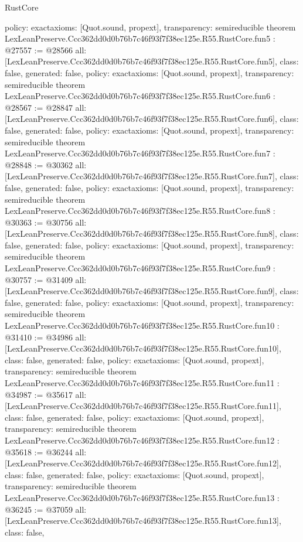 \begin{lexlean}{RustCore}
\begin{coremodule}
{  policy: exact{axioms: [Quot.sound, propext]},
  transparency: semireducible
}
theorem LexLeanPreserve.Ccc362dd0d0b76b7c46f93f7f38ec125e.R55.RustCore.fun5 : @27557 := @28566 {
  all: [LexLeanPreserve.Ccc362dd0d0b76b7c46f93f7f38ec125e.R55.RustCore.fun5],
  class: false,
  generated: false,
  policy: exact{axioms: [Quot.sound, propext]},
  transparency: semireducible
}
theorem LexLeanPreserve.Ccc362dd0d0b76b7c46f93f7f38ec125e.R55.RustCore.fun6 : @28567 := @28847 {
  all: [LexLeanPreserve.Ccc362dd0d0b76b7c46f93f7f38ec125e.R55.RustCore.fun6],
  class: false,
  generated: false,
  policy: exact{axioms: [Quot.sound, propext]},
  transparency: semireducible
}
theorem LexLeanPreserve.Ccc362dd0d0b76b7c46f93f7f38ec125e.R55.RustCore.fun7 : @28848 := @30362 {
  all: [LexLeanPreserve.Ccc362dd0d0b76b7c46f93f7f38ec125e.R55.RustCore.fun7],
  class: false,
  generated: false,
  policy: exact{axioms: [Quot.sound, propext]},
  transparency: semireducible
}
theorem LexLeanPreserve.Ccc362dd0d0b76b7c46f93f7f38ec125e.R55.RustCore.fun8 : @30363 := @30756 {
  all: [LexLeanPreserve.Ccc362dd0d0b76b7c46f93f7f38ec125e.R55.RustCore.fun8],
  class: false,
  generated: false,
  policy: exact{axioms: [Quot.sound, propext]},
  transparency: semireducible
}
theorem LexLeanPreserve.Ccc362dd0d0b76b7c46f93f7f38ec125e.R55.RustCore.fun9 : @30757 := @31409 {
  all: [LexLeanPreserve.Ccc362dd0d0b76b7c46f93f7f38ec125e.R55.RustCore.fun9],
  class: false,
  generated: false,
  policy: exact{axioms: [Quot.sound, propext]},
  transparency: semireducible
}
theorem LexLeanPreserve.Ccc362dd0d0b76b7c46f93f7f38ec125e.R55.RustCore.fun10 : @31410 := @34986 {
  all: [LexLeanPreserve.Ccc362dd0d0b76b7c46f93f7f38ec125e.R55.RustCore.fun10],
  class: false,
  generated: false,
  policy: exact{axioms: [Quot.sound, propext]},
  transparency: semireducible
}
theorem LexLeanPreserve.Ccc362dd0d0b76b7c46f93f7f38ec125e.R55.RustCore.fun11 : @34987 := @35617 {
  all: [LexLeanPreserve.Ccc362dd0d0b76b7c46f93f7f38ec125e.R55.RustCore.fun11],
  class: false,
  generated: false,
  policy: exact{axioms: [Quot.sound, propext]},
  transparency: semireducible
}
theorem LexLeanPreserve.Ccc362dd0d0b76b7c46f93f7f38ec125e.R55.RustCore.fun12 : @35618 := @36244 {
  all: [LexLeanPreserve.Ccc362dd0d0b76b7c46f93f7f38ec125e.R55.RustCore.fun12],
  class: false,
  generated: false,
  policy: exact{axioms: [Quot.sound, propext]},
  transparency: semireducible
}
theorem LexLeanPreserve.Ccc362dd0d0b76b7c46f93f7f38ec125e.R55.RustCore.fun13 : @36245 := @37059 {
  all: [LexLeanPreserve.Ccc362dd0d0b76b7c46f93f7f38ec125e.R55.RustCore.fun13],
  class: false,
}
\end{coremodule}
\end{lexlean}
